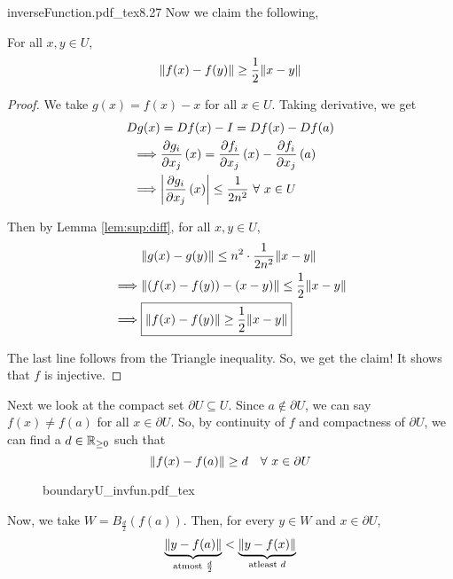 \documentclass[../Analysis-3.tex]{subfiles}
\begin{document}
\begin{proofFig}{\def\svgwidth{1.4in}
    {inverseFunction.pdf_tex}}{}{\label{fig:inf:fun}}{8}{.27\textwidth}
  Now we claim the following,
  \begin{clmBox}
    For all $ x, y \in U $,
    \[  \norm{f(x)-f(y)} \geq \frac{1}{2}\norm{x-y}  \]
  \end{clmBox}

  \begin{proof}
    We take $ g(x) = f(x) - x $ for all $ x \in U $. Taking derivative, we get
    \begin{align*}
      Dg(x)    & = Df(x) - I  = Df(x) - Df(a)                                                                     \\
      \implies & \pdv{g_i}{x_j}\left( x \right) = \pdv{f_i}{x_j}\left( x \right) - \pdv{f_i}{x_j}\left( a \right) \\
      \implies & \abs{\pdv{g_i}{x_j}\left( x \right)} \leq \frac{1}{2n^2} \ \forall\ x \in U
    \end{align*}

    Then by Lemma \ref{lem:sup:diff}, for all $ x, y \in U $,
    \begin{align}
               & \norm{g(x)-g(y)} \leq n^2\cdot\frac{1}{2n^2}\norm{x-y} \nonumber                          \\
      \implies & \norm{(f(x)-f(y)) - (x-y)} \leq \frac{1}{2}\norm{x-y}  \nonumber                          \\
      \implies & \boxed{\norm{f(x)-f(y)} \geq \frac{1}{2}\norm{x-y}} \label{eqn:clm:normdiff:ge:th:14.2.1}
    \end{align}

    The last line follows from the Triangle inequality. So, we get the claim! It shows that $ f $ is injective.
  \end{proof}

  Next we look at the compact set $ \partial U \subseteq U $. Since $ a \not\in \partial U $, we can say $ f(x) \not= f(a) $ for all $ x \in \partial U $. So, by continuity of $ f $ and compactness of $ \partial U $,  we can find a $ d \in \mathbb{R}_{\geq 0} $ such that
  \[  \norm{f(x)-f(a)} \geq d \quad \forall\ x \in \partial U \]

  \begin{figure}[h]
    \centering
    \def\svgwidth{5.4in}
    {boundaryU_invfun.pdf_tex}
    \caption{}
    \label{fig:boundaryU_invfun}
  \end{figure}

  Now, we take $ W = B_{\frac{d}{2}}\left( f(a) \right) $. Then, for every $ y \in W $ and $ x \in \partial U $,
  \begin{equation}\label{eqn:normdist:ytofa:ytofx:th:14.2.1}
    \underbrace{\norm{y-f(a)}}_{\text{atmost } \frac{d}{2}} < \underbrace{\norm{y-f(x)}}_{\text{atleast } d}
  \end{equation}



\end{proofFig}
\end{document}
